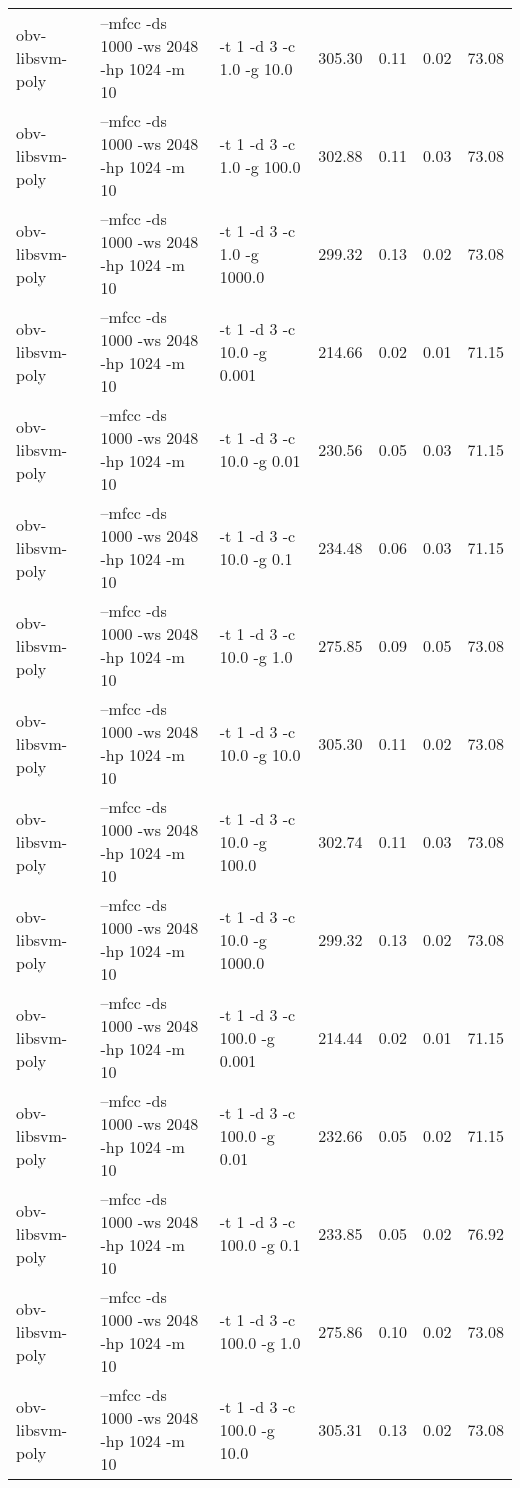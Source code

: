 \documentclass[11pt,a4paper]{article}
\begin{document}
\begin{tabular}{lllrrrr}
 obv-libsvm-poly  &  --mfcc -ds 1000 -ws 2048 -hp 1024 -m 10  &  -t 1 -d 3  -c 1.0    -g 10.0    &  305.30  &  0.11  &  0.02  &  73.08  \\
 obv-libsvm-poly  &  --mfcc -ds 1000 -ws 2048 -hp 1024 -m 10  &  -t 1 -d 3  -c 1.0    -g 100.0   &  302.88  &  0.11  &  0.03  &  73.08  \\
 obv-libsvm-poly  &  --mfcc -ds 1000 -ws 2048 -hp 1024 -m 10  &  -t 1 -d 3  -c 1.0    -g 1000.0  &  299.32  &  0.13  &  0.02  &  73.08  \\
 obv-libsvm-poly  &  --mfcc -ds 1000 -ws 2048 -hp 1024 -m 10  &  -t 1 -d 3  -c 10.0   -g 0.001   &  214.66  &  0.02  &  0.01  &  71.15  \\
 obv-libsvm-poly  &  --mfcc -ds 1000 -ws 2048 -hp 1024 -m 10  &  -t 1 -d 3  -c 10.0   -g 0.01    &  230.56  &  0.05  &  0.03  &  71.15  \\
 obv-libsvm-poly  &  --mfcc -ds 1000 -ws 2048 -hp 1024 -m 10  &  -t 1 -d 3  -c 10.0   -g 0.1     &  234.48  &  0.06  &  0.03  &  71.15  \\
 obv-libsvm-poly  &  --mfcc -ds 1000 -ws 2048 -hp 1024 -m 10  &  -t 1 -d 3  -c 10.0   -g 1.0     &  275.85  &  0.09  &  0.05  &  73.08  \\
 obv-libsvm-poly  &  --mfcc -ds 1000 -ws 2048 -hp 1024 -m 10  &  -t 1 -d 3  -c 10.0   -g 10.0    &  305.30  &  0.11  &  0.02  &  73.08  \\
 obv-libsvm-poly  &  --mfcc -ds 1000 -ws 2048 -hp 1024 -m 10  &  -t 1 -d 3  -c 10.0   -g 100.0   &  302.74  &  0.11  &  0.03  &  73.08  \\
 obv-libsvm-poly  &  --mfcc -ds 1000 -ws 2048 -hp 1024 -m 10  &  -t 1 -d 3  -c 10.0   -g 1000.0  &  299.32  &  0.13  &  0.02  &  73.08  \\
 obv-libsvm-poly  &  --mfcc -ds 1000 -ws 2048 -hp 1024 -m 10  &  -t 1 -d 3  -c 100.0  -g 0.001   &  214.44  &  0.02  &  0.01  &  71.15  \\
 obv-libsvm-poly  &  --mfcc -ds 1000 -ws 2048 -hp 1024 -m 10  &  -t 1 -d 3  -c 100.0  -g 0.01    &  232.66  &  0.05  &  0.02  &  71.15  \\
 obv-libsvm-poly  &  --mfcc -ds 1000 -ws 2048 -hp 1024 -m 10  &  -t 1 -d 3  -c 100.0  -g 0.1     &  233.85  &  0.05  &  0.02  &  76.92  \\
 obv-libsvm-poly  &  --mfcc -ds 1000 -ws 2048 -hp 1024 -m 10  &  -t 1 -d 3  -c 100.0  -g 1.0     &  275.86  &  0.10  &  0.02  &  73.08  \\
 obv-libsvm-poly  &  --mfcc -ds 1000 -ws 2048 -hp 1024 -m 10  &  -t 1 -d 3  -c 100.0  -g 10.0    &  305.31  &  0.13  &  0.02  &  73.08  \\

\end{tabular}
\end{document}

